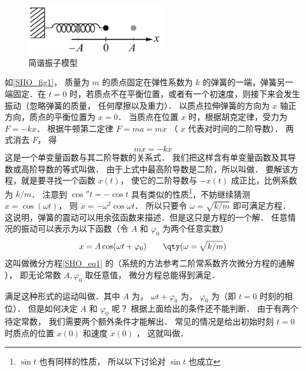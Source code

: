 

\begin{figure}[ht]
\centering
\includegraphics[width=6cm]{./figures/SHO.pdf}
\caption{简谐振子模型} \label{SHO_fig1}
\end{figure}

如\autoref{SHO_fig1}， 质量为 $m$ 的质点固定在弹性系数为 $k$ 的弹簧的一端，弹簧另一端固定．在 $t = 0$ 时，若质点不在平衡位置，或者有一个初速度，则接下来会发生振动（忽略弹簧的质量， 任何摩擦以及重力）． 以质点拉伸弹簧的方向为 $x$ 轴正方向，质点的平衡位置为 $x = 0$． 当质点在位置 $x$ 时，根据胡克定律，受力为 $F =  - kx$． 根据牛顿第二定律 $F = ma = m\ddot x$ （ $\ddot x$ 代表对时间的二阶导数）．  两式消去 $F$， 得
\begin{equation}\label{SHO_eq1}
m\ddot x =  - kx
\end{equation}
这是一个单变量函数与其二阶导数的关系式． 我们把这样含有单变量函数及其导数或高阶导数的等式叫做． 由于上式中最高阶导数是二阶，所以叫做． 要解该方程，就是要寻找一个函数 $x(t)$， 使它的二阶导数与 $- x(t)$ 成正比，比例系数为 $k/m$． 注意到 $\cos'' t =  - \cos t$ 具有类似的性质\footnote{$\sin t$ 也有同样的性质， 所以以下讨论对 $\sin t$ 也成立}，不妨继续猜测 $x = \cos(\omega t)$， 则 $\ddot x =  - {\omega ^2}\cos \omega t$． 所以只要令 $\omega = \sqrt{k/m}$ 即可满足方程． 这说明，弹簧的震动可以用余弦函数来描述．但是这只是方程的一个解． 任意情况的振动可以表示为以下函数（令 $A$ 和 $\varphi_0$ 为两个任意实数）
\begin{equation}\label{SHO_eq2}
x = A\cos(\omega t + \varphi _0)  \qquad \qty(\omega  = \sqrt{k/m})
\end{equation}
这叫做微分方程\autoref{SHO_eq1} 的（系统的方法参考二阶常系数齐次微分方程的通解
）， 即无论常数 $A, \varphi_0$ 取任意值， 微分方程总能得到满足．

满足这种形式的运动叫做．其中 $A$ 为， $\omega t + \varphi _0$ 为， $\varphi _0$ 为（即 $t = 0$ 时刻的相位）． 但是如何决定 $A$ 和 $\varphi _0$ 呢？ 根据上面给出的条件还不能判断． 由于有两个待定常数， 我们需要两个额外条件才能解出． 常见的情况是给出初始时刻 $t = 0$ 时质点的位置 $x(0)$ 和速度 $\dot x(0)$ ， 这就叫做．

